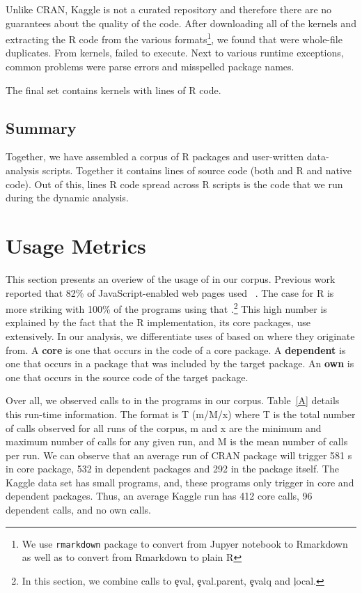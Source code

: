 \documentclass[conference]{IEEEtran}
\begin{document}
Unlike CRAN, Kaggle is not a curated repository and therefore there are no
guarantees about the quality of the code. After downloading all of the
\CorpusKaggle kernels and extracting the R code from the various
formats\footnote{We use \texttt{rmarkdown} package to convert from Jupyer
  notebook to Rmarkdown as well as to convert from Rmarkdown to plain R}, we
found that \CorpusDuplicatedKaggle were whole-file duplicates. From
\CorpusRunnableKaggle kernels, \CorpusFailedKaggle failed to execute. Next to
various runtime exceptions, common problems were parse errors and misspelled
package names.

The final set contains \CorpusFinishedKaggle kernels with
\CorpusFinishedKaggleCodeRnd {} lines of R
code.

\subsection{Summary}

Together, we have assembled a corpus of \CorpusPackages R packages and
\CorpusFinishedKaggle user-written data-analysis scripts. Together it contains
\CorpusAllCodeRnd lines of source code (both and R and native code). Out of
this, \CorpusAllRunnbaleCode lines R code spread across \CorpusAllPrograms R
scripts is the code that we run during the dynamic analysis.

\section{Usage Metrics}

This section presents an overiew of the usage of \eval in our corpus.
Previous work reported that 82\% of JavaScript-enabled web pages used
\eval~\cite{ecoop11}. The case for R is more striking with 100\% of the
programs using that \eval.\footnote{In this section, we combine calls to
  \c{eval}, \c{eval.parent}, \c{evalq} and \c{local}.}  This high number is
explained by the fact that the R implementation, its core packages, use
\eval extensively. In our analysis, we differentiate uses of \eval based on
where they originate from. A {\bf core} \eval is one that occurs in the code
of a core package.  A {\bf dependent} \eval is one that occurs in a package
that was included by the target package. An {\bf own} \eval is one that
occurs in the source code of the target package.

Over all, we observed \AllAllCallCountRnd calls to \eval in the
\CorpusAllProgramsRnd programs in our corpus.  Table~\ref{A} details this
run-time information. The format is T (m/M/x) where T is the total number of
calls observed for all runs of the corpus, m and x are the minimum and
maximum number of calls for any given run, and M is the mean number of calls
per run. We can observe that an average run of CRAN package will trigger 581
{\eval}s in core package, 532 in dependent packages and 292 in the package
itself.  The Kaggle data set has small programs, and, these programs only
trigger \eval in core and dependent packages. Thus, an average Kaggle run
has 412 core calls, 96 dependent calls, and no own calls.
\end{document}
